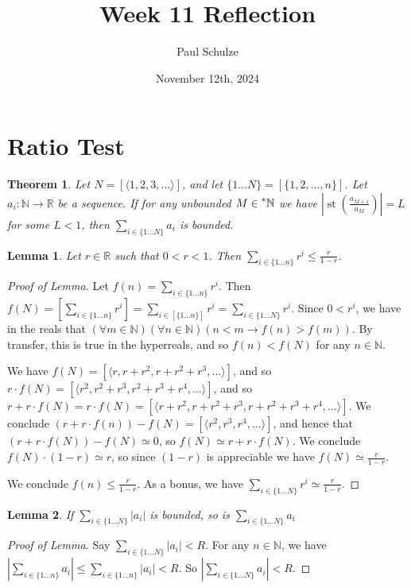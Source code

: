 \documentclass{article}
\title{Week 11 Reflection}
\author{Paul Schulze}
\date{November 12th, 2024}
\newcommand{\stp}[1]{\st\left(#1\right)}
\newcommand{\reals}{\mathbb{R}}
\newcommand{\nats}{\mathbb{N}}
\newcommand{\hnats}{\prescript{*}{}{\mathbb{N}}}
\DeclareMathOperator{\st}{st}
\newtheorem*{thm}{Theorem}
\newtheorem*{lemma}{Lemma}
\theoremstyle{definition}
\begin{document}
\maketitle

\section{Ratio Test}
\begin{thm}
    Let $N = [\langle 1, 2, 3, \ldots \rangle]$, and let $\{1\ldots N\} = [\{1, 2, \ldots, n\}]$. Let $a_i: \nats \to \reals$ be a sequence. If for any unbounded $M \in \hnats$ we have $\left|\stp{\frac{a_{M+1}}{a_M}}\right| = L$ for some $L < 1$, then $\sum_{i \in \{1\ldots N\}} a_i$ is bounded.
\end{thm}

\begin{lemma}
    Let $r \in \reals$ such that $0 < r < 1$. Then $\sum_{i \in \{1\ldots n\}} r^i \leq \frac{r}{1-r}$.
\end{lemma}
\begin{proof}[Proof of Lemma]
    Let $f(n) = \sum_{i \in \{1\ldots n\}} r^i$. Then $f(N) = \left[\sum_{i \in \{1\ldots n\}} r^i\right] = \sum_{i \in [\{1\ldots n\}]} r^i = \sum_{i \in \{1\ldots N\}} r^i$. Since $0 < r^i$, we have in the reals that $(\forall m \in \nats)(\forall n \in \nats)(n < m \to f(n) > f(m))$. By transfer, this is true in the hyperreals, and so $f(n) < f(N)$ for any $n \in \nats$.

    We have $f(N) = [\langle r, r + r^2, r + r^2 + r^3, \ldots \rangle]$, and so $r \cdot f(N) = [\langle r^2, r^2 + r^3, r^2 + r^3 + r^4, \ldots \rangle]$, and so $r + r \cdot f(N) = r \cdot f(N) = [\langle r + r^2, r + r^2 + r^3, r + r^2 + r^3 + r^4, \ldots \rangle]$. We conclude $\left(r + r\cdot f(n)\right) - f(N) = [\langle r^2, r^3, r^4, \ldots \rangle]$, and hence that $\left(r + r\cdot f(N)\right) - f(N) \simeq 0$, so $f(N) \simeq r + r \cdot f(N)$. We conclude $f(N) \cdot (1 - r) \simeq r$, so since $(1 - r)$ is appreciable we have $f(N) \simeq \frac{r}{1 - r}$.

    We conclude $f(n) \leq \frac{r}{1 - r}$. As a bonus, we have $\sum_{i \in \{1\ldots N\}} r^i \simeq \frac{r}{1-r}$.
\end{proof}

\begin{lemma}
    If $\sum_{i \in \{1\ldots N\}} |a_i|$ is bounded, so is $\sum_{i \in \{1\ldots N\}} a_i$
\end{lemma}
\begin{proof}[Proof of Lemma]
    Say $\sum_{i \in \{1\ldots N\}} |a_i| < R$. For any $n \in \nats$, we have $\left|\sum_{i \in \{1 \ldots n\}} a_i\right| \leq \sum_{i \in \{1 \ldots n\}} |a_i| < R$. So $\left|\sum_{i \in \{1 \ldots N\}} a_i\right| < R$.
\end{proof}
\end{document}
